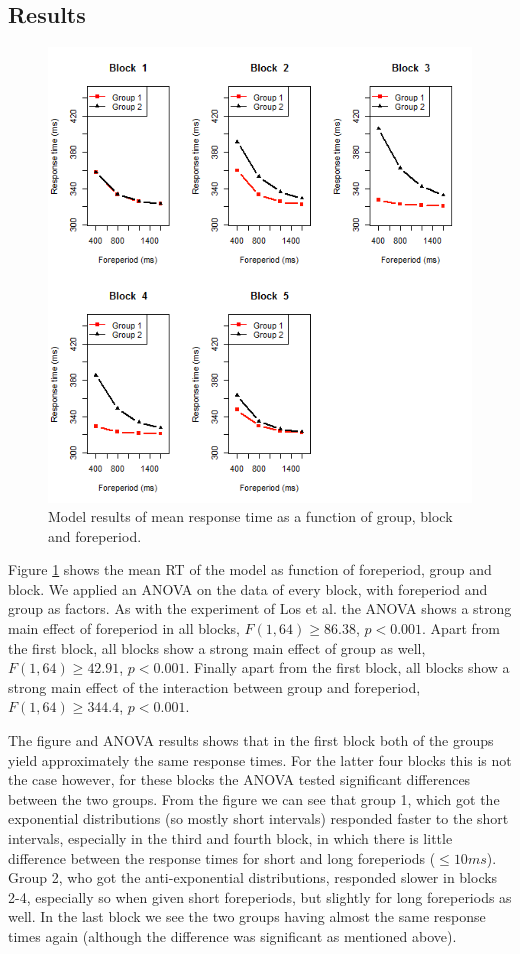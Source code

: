 \documentclass[10pt,letterpaper]{article}
\begin{document}
\subsection{Results}
\begin{figure}
	\centering
	\includegraphics[width=\columnwidth]{5blocks2.png}
	\caption{Model results of mean response time as a function of group, block and foreperiod.}
	\label{5blocks}
\end{figure}
Figure \ref{5blocks} shows the mean RT of the model as function of foreperiod, group and block. We applied an ANOVA on the data of every block, with foreperiod and group as factors. As with the experiment of Los et al. the ANOVA shows a strong main effect of foreperiod in all blocks, $F(1,64) \geq 86.38$, $p < 0.001$. Apart from the first block, all blocks show a strong main effect of group as well, $F(1,64) \geq 42.91$, $p < 0.001$. Finally apart from the first block, all blocks show a strong main effect of the interaction between group and foreperiod, $F(1,64) \geq 344.4$, $p < 0.001$.

The figure and ANOVA results shows that in the first block both of the groups yield approximately the same response times. For the latter four blocks this is not the case however, for these blocks the ANOVA tested significant differences between the two groups. From the figure we can see that group 1, which got the exponential distributions (so mostly short intervals) responded faster to the short intervals, especially in the third and fourth block, in which there is little difference between the response times for short and long foreperiods ($\leq 10 ms$). Group 2, who got the anti-exponential distributions, responded slower in blocks 2-4, especially so when given short foreperiods, but slightly for long foreperiods as well. In the last block we see the two groups having almost the same response times again (although the difference was significant as mentioned above).
\end{document}
